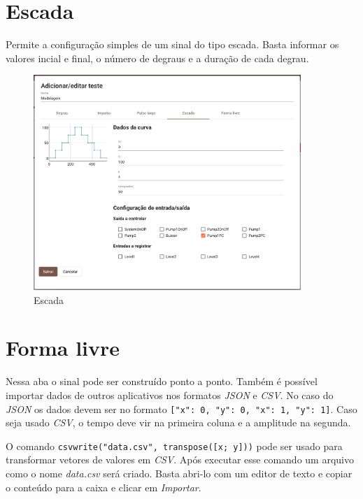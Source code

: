 \newpage{}
\section{Escada}%
\label{sec:stairs}

Permite a configuração simples de um sinal do tipo escada. Basta informar os
valores incial e final, o número de degraus e a duração de cada degrau.

\begin{figure}[ht!]
    \centering
    \includegraphics[width=0.9\textwidth]{imgs/system-response6}
    \caption[Escada]{Escada}%
    \label{fig:system-response6}
\end{figure}

\newpage{}
\section{Forma livre}%
\label{sec:free-form}

Nessa aba o sinal pode ser construído ponto a ponto. Também é possível importar
dados de outros aplicativos nos formatos \textit{JSON} e \textit{CSV}. No caso
do \textit{JSON} os dados devem ser no formato \texttt{[{"x": 0,
"y": 0}, {"x": 1, "y": 1}]}. Caso seja usado \textit{CSV}, o tempo deve vir na
primeira coluna e a amplitude na segunda.

O comando \texttt{csvwrite("data.csv", transpose([x; y]))} pode ser
usado para transformar vetores de valores em \textit{CSV}. Após executar esse
comando um arquivo como o nome \textit{data.csv} será criado. Basta abri-lo com
um editor de texto e copiar o conteúdo para a caixa e clicar em
\textit{Importar}.

